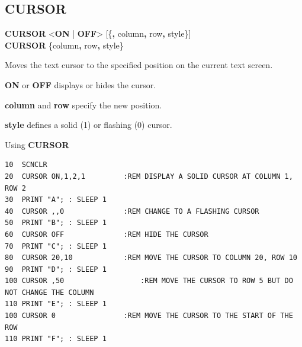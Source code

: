 \subsection{CURSOR}
\begin{description}[leftmargin=2cm,style=nextline]
\item [Format:] {\bf CURSOR} <{\bf ON} | {\bf OFF}> [\{{\bf,} column{\bf,} row{\bf,} style\}] \\
		{\bf CURSOR} \{column{\bf,} row{\bf,} style\}
\item [Usage:] Moves the text cursor to
               the specified position on the current text screen.

               {\bf ON} or {\bf OFF} displays or hides the cursor.

               {\bf column} and {\bf row} specify the new position.

               {\bf style} defines a solid (1) or flashing (0) cursor.
\item [Example:] Using {\bf CURSOR}
\begin{tcolorbox}[colback=black,coltext=white]
\verbatimfont{\codefont}
\begin{verbatim}
10  SCNCLR
20  CURSOR ON,1,2,1         :REM DISPLAY A SOLID CURSOR AT COLUMN 1, ROW 2
30  PRINT "A"; : SLEEP 1
40  CURSOR ,,0              :REM CHANGE TO A FLASHING CURSOR
50  PRINT "B"; : SLEEP 1
60  CURSOR OFF              :REM HIDE THE CURSOR
70  PRINT "C"; : SLEEP 1
80  CURSOR 20,10            :REM MOVE THE CURSOR TO COLUMN 20, ROW 10
90  PRINT "D"; : SLEEP 1
100 CURSOR ,50                  :REM MOVE THE CURSOR TO ROW 5 BUT DO NOT CHANGE THE COLUMN
110 PRINT "E"; : SLEEP 1
100 CURSOR 0                :REM MOVE THE CURSOR TO THE START OF THE ROW
110 PRINT "F"; : SLEEP 1
\end{verbatim}
\end{tcolorbox}
\end{description}


\newpage
